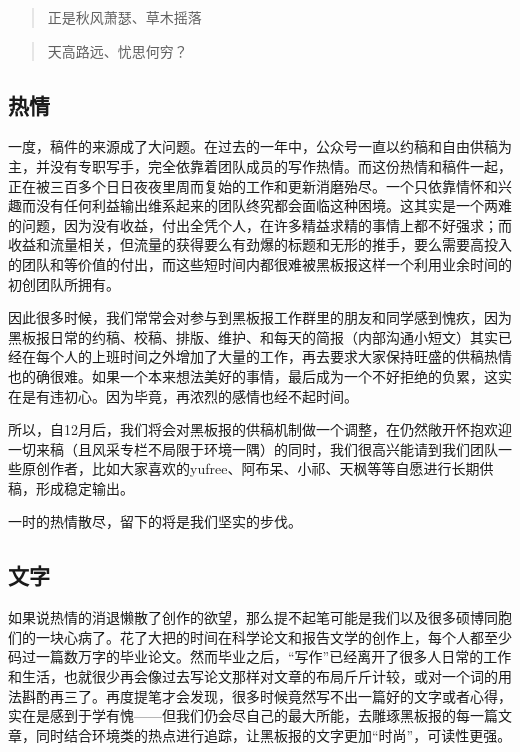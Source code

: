 \documentclass[
]{book}
\begin{document}
\begin{quote}
正是秋风萧瑟、草木摇落
\end{quote}

\begin{quote}
天高路远、忧思何穷？
\end{quote}

\hypertarget{ux70edux60c5}{%
\subsection{热情}\label{ux70edux60c5}}

一度，稿件的来源成了大问题。在过去的一年中，公众号一直以约稿和自由供稿为主，并没有专职写手，完全依靠着团队成员的写作热情。而这份热情和稿件一起，正在被三百多个日日夜夜里周而复始的工作和更新消磨殆尽。一个只依靠情怀和兴趣而没有任何利益输出维系起来的团队终究都会面临这种困境。这其实是一个两难的问题，因为没有收益，付出全凭个人，在许多精益求精的事情上都不好强求；而收益和流量相关，但流量的获得要么有劲爆的标题和无形的推手，要么需要高投入的团队和等价值的付出，而这些短时间内都很难被黑板报这样一个利用业余时间的初创团队所拥有。

因此很多时候，我们常常会对参与到黑板报工作群里的朋友和同学感到愧疚，因为黑板报日常的约稿、校稿、排版、维护、和每天的简报（内部沟通小短文）其实已经在每个人的上班时间之外增加了大量的工作，再去要求大家保持旺盛的供稿热情也的确很难。如果一个本来想法美好的事情，最后成为一个不好拒绝的负累，这实在是有违初心。因为毕竟，再浓烈的感情也经不起时间。

所以，自12月后，我们将会对黑板报的供稿机制做一个调整，在仍然敞开怀抱欢迎一切来稿（且风采专栏不局限于环境一隅）的同时，我们很高兴能请到我们团队一些原创作者，比如大家喜欢的yufree、阿布呆、小祁、天枫等等自愿进行长期供稿，形成稳定输出。

一时的热情散尽，留下的将是我们坚实的步伐。

\hypertarget{ux6587ux5b57}{%
\subsection{文字}\label{ux6587ux5b57}}

如果说热情的消退懒散了创作的欲望，那么提不起笔可能是我们以及很多硕博同胞们的一块心病了。花了大把的时间在科学论文和报告文学的创作上，每个人都至少码过一篇数万字的毕业论文。然而毕业之后，``写作''已经离开了很多人日常的工作和生活，也就很少再会像过去写论文那样对文章的布局斤斤计较，或对一个词的用法斟酌再三了。再度提笔才会发现，很多时候竟然写不出一篇好的文字或者心得，实在是感到于学有愧------但我们仍会尽自己的最大所能，去雕琢黑板报的每一篇文章，同时结合环境类的热点进行追踪，让黑板报的文字更加``时尚''，可读性更强。
\end{document}
